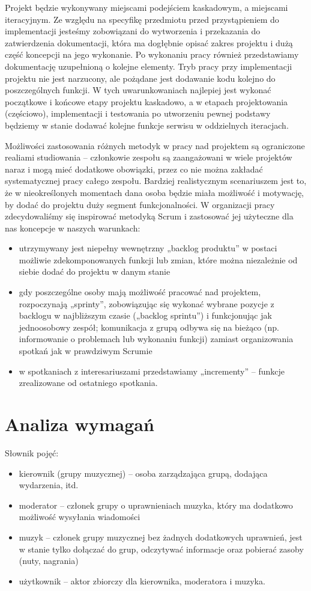 \documentclass[11pt,a4paper]{article}
\renewcommand{\_}{\char`_}
\begin{document}
Projekt będzie wykonywany miejscami podejściem kaskadowym, a miejscami iteracyjnym. Ze względu na specyfikę przedmiotu przed przystąpieniem do implementacji jesteśmy zobowiązani do wytworzenia i przekazania do zatwierdzenia dokumentacji, która ma dogłębnie opisać zakres projektu i dużą część koncepcji na jego wykonanie. Po wykonaniu pracy również przedstawiamy dokumentację uzupełnioną o kolejne elementy. Tryb pracy przy implementacji projektu nie jest narzucony, ale pożądane jest dodawanie kodu kolejno do poszczególnych funkcji. W tych uwarunkowaniach najlepiej jest wykonać początkowe i końcowe etapy projektu kaskadowo, a w etapach projektowania (częściowo), implementacji i testowania po utworzeniu pewnej podstawy będziemy w stanie dodawać kolejne funkcje serwisu w oddzielnych iteracjach.

Możliwości zastosowania różnych metodyk w pracy nad projektem są ograniczone realiami studiowania – członkowie zespołu są zaangażowani w wiele projektów naraz i mogą mieć dodatkowe obowiązki, przez co nie można zakładać systematycznej pracy całego zespołu. Bardziej realistycznym scenariuszem jest to, że w nieokreślonych momentach dana osoba będzie miała możliwość i motywację, by dodać do projektu duży segment funkcjonalności. W organizacji pracy zdecydowaliśmy się inspirować metodyką Scrum i zastosować jej użyteczne dla nas koncepcje w naszych warunkach:
\begin{itemize}
    \item utrzymywany jest niepełny wewnętrzny „backlog produktu” w postaci możliwie zdekomponowanych funkcji lub zmian, które można niezależnie od siebie dodać do projektu w danym stanie
    \item gdy poszczególne osoby mają możliwość pracować nad projektem, rozpoczynają „sprinty”, zobowiązując się wykonać wybrane pozycje z backlogu w najbliższym czasie („backlog sprintu”) i funkcjonując jak jednoosobowy zespół; komunikacja z grupą odbywa się na bieżąco (np. informowanie o problemach lub wykonaniu funkcji) zamiast organizowania spotkań jak w prawdziwym Scrumie
    \item w spotkaniach z interesariuszami przedstawiamy „incrementy” – funkcje zrealizowane od ostatniego spotkania.
\end{itemize}

\section{Analiza wymagań}

Słownik pojęć:
\begin{itemize}
    \item kierownik (grupy muzycznej) – osoba zarządzająca grupą, dodająca wydarzenia, itd.
    \item moderator – członek grupy o uprawnieniach muzyka, który ma dodatkowo możliwość wysyłania wiadomości
    \item muzyk – członek grupy muzycznej bez żadnych dodatkowych uprawnień, jest w stanie tylko dołączać do grup, odczytywać informacje oraz pobierać zasoby (nuty, nagrania)
    \item użytkownik – aktor zbiorczy dla kierownika, moderatora i muzyka.
\end{itemize}
\end{document}
